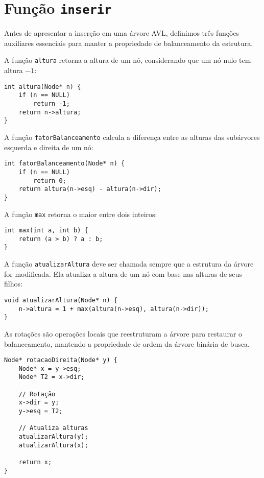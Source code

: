 \section*{Função {\tt inserir}}

Antes de apresentar a inserção em uma árvore AVL, definimos três funções auxiliares essenciais para manter a propriedade de balanceamento da estrutura.

A função \texttt{altura} retorna a altura de um nó, considerando que um nó nulo tem altura $-1$:

\begin{lstlisting}
int altura(Node* n) {
    if (n == NULL)
        return -1;
    return n->altura;
}
\end{lstlisting}

A função \texttt{fatorBalanceamento} calcula a diferença entre as alturas das subárvores esquerda e direita de um nó:

\begin{lstlisting}
int fatorBalanceamento(Node* n) {
    if (n == NULL)
        return 0;
    return altura(n->esq) - altura(n->dir);
}
\end{lstlisting}

A função \texttt{max} retorna o maior entre dois inteiros:

\begin{lstlisting}
int max(int a, int b) {
    return (a > b) ? a : b;
}
\end{lstlisting}

A função \texttt{atualizarAltura} deve ser chamada sempre que a estrutura da árvore for modificada. 
Ela atualiza a altura de um nó com base nas alturas de seus filhos:

\begin{lstlisting}
void atualizarAltura(Node* n) {
    n->altura = 1 + max(altura(n->esq), altura(n->dir));
}
\end{lstlisting}

As rotações são operações locais que reestruturam a árvore para restaurar o balanceamento, mantendo a propriedade de ordem da árvore binária de busca.

\begin{lstlisting}
Node* rotacaoDireita(Node* y) {
    Node* x = y->esq;
    Node* T2 = x->dir;

    // Rotação
    x->dir = y;
    y->esq = T2;

    // Atualiza alturas
    atualizarAltura(y);
    atualizarAltura(x);

    return x;
}
\end{lstlisting}

